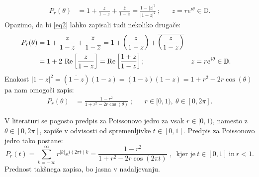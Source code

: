 \documentclass[mat1]{fmfdelo}
\begin{document}
    \begin{align}
        \label{eq2}
        P_r(\theta) &= 1 + \frac{z}{1 - z}+ \frac{\overline{z}}{1 - \overline{z}} = \frac{1 - |z|^2}{|1-z|^2}~;& &z = r e^{i\theta} \in \mathbb{D}.
    \end{align}
    Opazimo, da bi \eqref{eq2} lahko zapisali tudi nekoliko drugače:
    \begin{align}
        \label{eq3}
        P_r(\theta) &= 1 + \frac{z}{1 - z}+ \frac{\overline{z}}{1 - \overline{z}} = 1 + \left(\frac{z}{1 - z} \right)+ \overline{\left(\frac{z}{1 - z}\right)} \notag \\
        &= 1 + 2~\text{Re}\left[\frac{z}{1-z}\right] =\text{Re}\left[\frac{1 + z}{1-z}\right]; & &z = r e^{i\theta} \in \mathbb{D}.
    \end{align}
    Enakost $|1 - z|^2 = (\overline{1 - z})(1 - z) = (1 - \overline{z})(1 - z) = 1 + r^2 - 2r \cos(\theta)$ pa nam omogoči zapis:
    \begin{align}
        \label{eq4}
        P_r(\theta) & = \frac{1-r^2}{1+ r^2 - 2r \cos(\theta)}~; & &r \in [0,1),~\theta \in [0,2\pi].
    \end{align}
    \begin{opomba}
        \label{par_s_t_Pr}
        V literaturi se pogosto predpis za Poissonovo jedro za vsak $r \in [0,1)$, namesto z $\theta \in [0, 2\pi]$, zapiše v odvisosti od spremenljivke $t \in [0,1]$.
        Predpis za Poissonovo jedro tako postane:
        \begin{equation}
            \label{poisson_t}
           P_r(t) = \sum_{k = -\infty}^{\infty}{r^{|k|} e^{i (2 \pi t)k }} = \frac{1-r^2}{1+ r^2 - 2r \cos(2 \pi t)}\text{~,~~kjer je}~ t\in [0, 1]~\text{in}~ r < 1.
        \end{equation}
        Prednost takšnega zapisa, bo jasna v nadaljevanju.
    \end{opomba}
\end{document}
